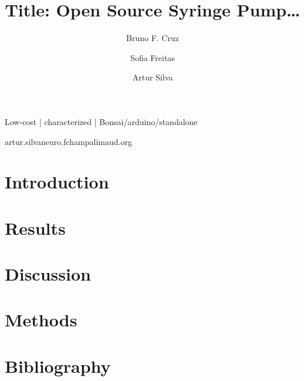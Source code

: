 
\title{Title: Open Source Syringe Pump…}

\author[1,2]{Bruno F. Cruz }
\author[2]{Sofia Freitas }
\author[1,\Letter]{Artur Silva }
\date{}

\maketitle

\begin{abstract}


\end{abstract}

\begin{keywords}
Low-cost | characterized | Bonsai/arduino/standalone
\end{keywords}

\begin{corrauthor}
artur.silva\at neuro.fchampalimaud.org
\end{corrauthor}

\section*{Introduction}\label{s:introduction}


\section*{Results}\label{s:results}


\section*{Discussion}\label{s:discussion}


\section*{Methods}\label{s:methods}


\section*{Bibliography}



